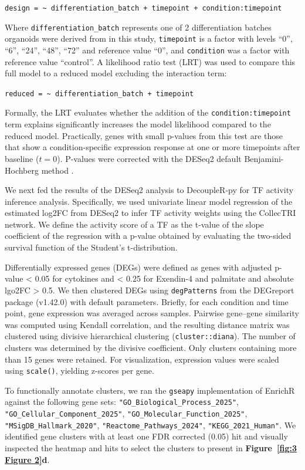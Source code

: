 \texttt{design = \textasciitilde{} differentiation\_batch + timepoint + condition:timepoint}

Where \texttt{differentiation\_batch} represents one of 2 differentiation batches organoids were derived from in this study, \texttt{timepoint} is a factor with levels ``0'', ``6'', ``24'', ``48'', ``72'' and reference value ``0'', and \texttt{condition} was a factor with reference value ``control''. A likelihood ratio test (LRT) was used to compare this full model to a reduced model excluding the interaction term:

\texttt{reduced = \textasciitilde{} differentiation\_batch + timepoint}

Formally, the LRT evaluates whether the addition of the \texttt{condition:timepoint} term explains significantly increases the model likelihood compared to the reduced model. Practically, genes with small p-values from this test are those that show a condition-specific expression response at one or more timepoints after baseline (\(t = 0\)). P-values were corrected with the DESeq2 default Benjamini-Hochberg method \cite{Benjamini1995-da}.

We next fed the results of the DESeq2 analysis to DecoupleR-py \cite{Badia-I-Mompel2022-se} for TF activity inference analysis. Specifically, we used univariate linear model regression of the estimated log2FC from DESeq2 to infer TF activity weights using the CollecTRI \cite{Muller-Dott2023-zc} network. We define the activity score of a TF as the t-value of the slope coefficient of the regression with a p-value obtained by evaluating the two-sided survival function of the Student’s t-distribution.

Differentially expressed genes (DEGs) were defined as genes with adjusted p-value < 0.05 for cytokines and < 0.25 for Exendin-4 and palmitate and absolute lgo2FC > 0.5. We then clustered DEGs using \texttt{degPatterns} from the DEGreport package (v1.42.0) with default parameters. Briefly, for each condition and time point, gene expression was averaged across samples. Pairwise gene–gene similarity was computed using Kendall correlation, and the resulting distance matrix was clustered using divisive hierarchical clustering (\texttt{cluster::diana}). The number of clusters was determined by the divisive coefficient. Only clusters containing more than 15 genes were retained. For visualization, expression values were scaled using \texttt{scale()}, yielding z-scores per gene.

To functionally annotate clusters, we ran the \texttt{gseapy} \cite{Fang2023-st} implementation of EnrichR \cite{Xie2021-me} against the following gene sets: \texttt{"GO\_Biological\_Process\_2025"}, \texttt{"GO\_Cellular\_Component\_2025"}, \texttt{"GO\_Molecular\_Function\_2025"}, \texttt{"MSigDB\_Hallmark\_2020"}, \texttt{"Reactome\_Pathways\_2024"}, \texttt{"KEGG\_2021\_Human"}. We identified gene clusters with at least one FDR corrected (0.05) hit and visually inspected the heatmap and hits to select the clusters to present in \textbf{Figure~\ref{fig:3 Figure 2}d}.

